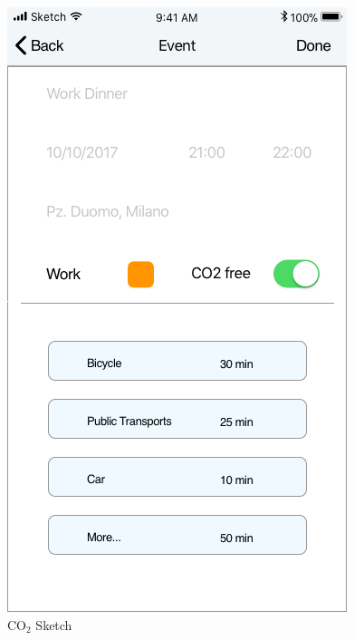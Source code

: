 \begin{figure}[H]
	\includegraphics[scale=0.23]{Images/Interface/CO2/2_CO2_enabled}
	\caption{CO$_2$ Sketch}
\end{figure}

